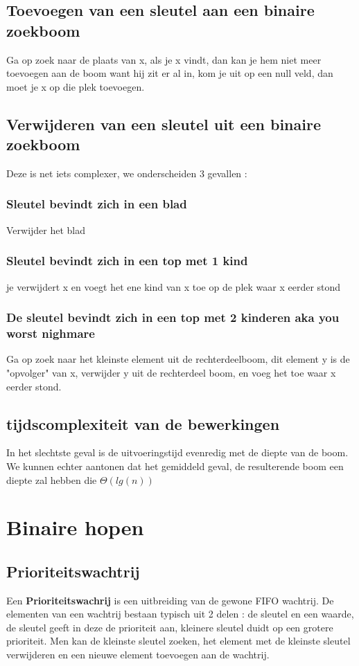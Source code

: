 \documentclass{report}
\begin{document}
  			\subsection{Toevoegen van een sleutel aan een binaire zoekboom}
  				Ga op zoek naar de plaats van x, als je x vindt, dan kan je hem niet meer toevoegen aan de boom want hij zit er al in, kom je uit op een null veld, dan moet je x op die plek toevoegen.
  			\subsection{Verwijderen van een sleutel uit een binaire zoekboom}
  				Deze is net iets complexer, we onderscheiden 3 gevallen : 
  				\subsubsection{Sleutel bevindt zich in een blad}
  					Verwijder het blad
  				\subsubsection{Sleutel bevindt zich in een top met 1 kind}
  					je verwijdert x en voegt het ene kind van x toe op de plek waar x eerder stond
  				\subsubsection{De sleutel bevindt zich in een top met 2 kinderen aka you worst nighmare}
  					Ga op zoek naar het kleinste element uit de rechterdeelboom, dit element y is de "opvolger" van x, verwijder y uit de rechterdeel boom, en voeg het toe waar x eerder stond.  
  			\subsection{tijdscomplexiteit van de bewerkingen}
  				In het slechtste geval is de uitvoeringstijd evenredig met de diepte van de boom. We kunnen echter aantonen dat het gemiddeld geval, de resulterende boom een diepte zal hebben die \(\Theta(lg(n))\)
  		\section{Binaire hopen}
  			\subsection{Prioriteitswachtrij}
  				Een \textbf{Prioriteitswachrij} is een uitbreiding van de gewone FIFO wachtrij. De elementen van een wachtrij bestaan typisch uit 2 delen : de sleutel en een waarde, de sleutel geeft in deze de prioriteit aan, kleinere sleutel duidt op een grotere prioriteit. Men kan de kleinste sleutel zoeken, het element met de kleinste sleutel verwijderen en een nieuwe element toevoegen aan de wachtrij.
\end{document}
